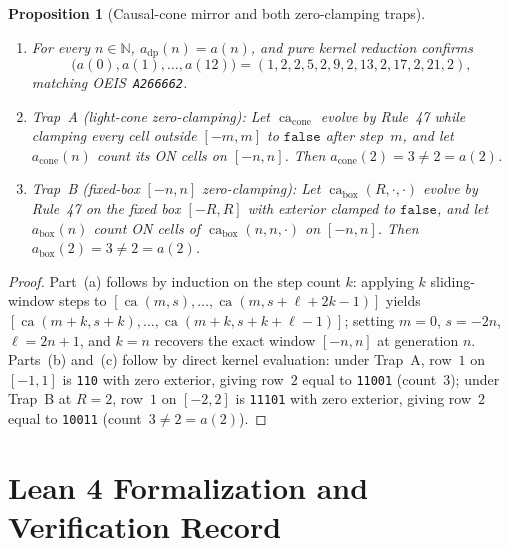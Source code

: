 \documentclass[11pt]{article}
\newtheorem{proposition}[theorem]{Proposition}
\theoremstyle{definition}
\newcommand{\N}{\mathbb{N}}
\newcommand{\seq}[1]{\texttt{#1}}
\newcommand{\ca}{\operatorname{ca}}
\begin{document}
\begin{proposition}[Causal-cone mirror and both zero-clamping traps]
\label{prop:clamping-traps}
\begin{enumerate}
\item[\textup{(a)}] For every $n \in \N$, $a_{\mathrm{dp}}(n) = a(n)$, and pure kernel reduction confirms
\[
\bigl(a(0), a(1), \dots, a(12)\bigr) = (1, 2, 2, 5, 2, 9, 2, 13, 2, 17, 2, 21, 2),
\]
matching OEIS~\seq{A266662}.
\item[\textup{(b)}] \emph{Trap~A (light-cone zero-clamping):} Let $\ca_{\mathrm{cone}}$ evolve by Rule~47 while clamping every cell outside $[-m, m]$ to $\mathtt{false}$ after step~$m$, and let $a_{\mathrm{cone}}(n)$ count its ON cells on $[-n, n]$. Then $a_{\mathrm{cone}}(2) = 3 \ne 2 = a(2)$.
\item[\textup{(c)}] \emph{Trap~B (fixed-box $[-n, n]$ zero-clamping):} Let $\ca_{\mathrm{box}}(R, \cdot, \cdot)$ evolve by Rule~47 on the fixed box $[-R, R]$ with exterior clamped to $\mathtt{false}$, and let $a_{\mathrm{box}}(n)$ count ON cells of $\ca_{\mathrm{box}}(n, n, \cdot)$ on $[-n, n]$. Then $a_{\mathrm{box}}(2) = 3 \ne 2 = a(2)$.
\end{enumerate}
\end{proposition}

\begin{proof}
Part~(a) follows by induction on the step count $k$: applying $k$ sliding-window steps to $[\ca(m, s), \dots, \ca(m, s + \ell + 2k - 1)]$ yields $[\ca(m + k, s + k), \dots, \ca(m + k, s + k + \ell - 1)]$; setting $m = 0$, $s = -2n$, $\ell = 2n + 1$, and $k = n$ recovers the exact window $[-n, n]$ at generation $n$. Parts~(b) and~(c) follow by direct kernel evaluation: under Trap~A, row~$1$ on $[-1, 1]$ is \texttt{110} with zero exterior, giving row~$2$ equal to \texttt{11001} (count~$3$); under Trap~B at $R = 2$, row~$1$ on $[-2, 2]$ is \texttt{11101} with zero exterior, giving row~$2$ equal to \texttt{10011} (count~$3 \ne 2 = a(2)$).
\end{proof}

\section{Lean 4 Formalization and Verification Record}
\end{document}
